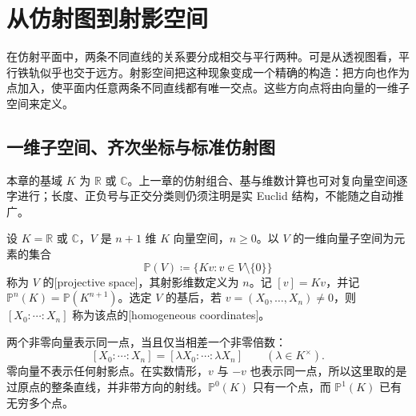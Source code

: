 
% 
% 

\section{从仿射图到射影空间}
\label{g1:sec:0201}

在仿射平面中，两条不同直线的关系要分成相交与平行两种。可是从透视图看，平行铁轨似乎也交于远方。射影空间把这种现象变成一个精确的构造：把方向也作为点加入，使平面内任意两条不同直线都有唯一交点。这些方向点将由向量的一维子空间来定义。

\subsection{一维子空间、齐次坐标与标准仿射图}
\label{g1:subsec:0201:01}

本章的基域 \(K\) 为 \(\mathbb R\) 或 \(\mathbb C\)。上一章的仿射组合、基与维数计算也可对复向量空间逐字进行；长度、正负号与正交分类则仍须注明是实 Euclid 结构，不能随之自动推广。

\begin{definition}[射影空间]\label{g1:def:projective-space}
	设 \(K=\mathbb R\) 或 \(\mathbb C\)，\(V\) 是 \(n+1\) 维 \(K\) 向量空间，\(n\geq0\)。以 \(V\) 的一维向量子空间为元素的集合
	\[
		\mathbb P(V)\coloneqq\{Kv:v\in V\setminus\{0\}\}
	\]
	称为 \(V\) 的[projective space]，其射影维数定义为 \(n\)。记 \([v]=Kv\)，并记 \(\mathbb P^n(K)=\mathbb P(K^{n+1})\)。选定 \(V\) 的基后，若 \(v=(X_0,\ldots,X_n)\ne0\)，则 \([X_0:\cdots:X_n]\) 称为该点的[homogeneous coordinates]。
\end{definition}

两个非零向量表示同一点，当且仅当相差一个非零倍数：
\[
	[X_0:\cdots:X_n]=[\lambda X_0:\cdots:\lambda X_n]\qquad(\lambda\in K^\times).
\]
零向量不表示任何射影点。在实数情形，\(v\) 与 \(-v\) 也表示同一点，所以这里取的是过原点的整条直线，并非带方向的射线。\(\mathbb P^0(K)\) 只有一个点，而 \(\mathbb P^1(K)\) 已有无穷多个点。

